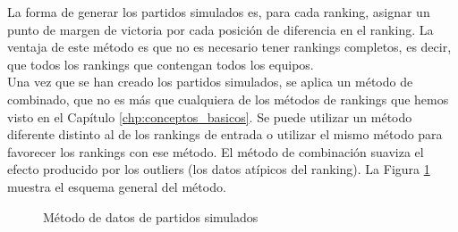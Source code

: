 La forma de generar los partidos simulados es, para cada ranking, asignar un punto de margen de victoria por cada posición de diferencia en el ranking. La ventaja de este método es que no es necesario tener rankings completos, es decir, que todos los rankings que contengan todos los equipos. \\

Una vez que se han creado los partidos simulados, se aplica un método de combinado, que no es más que cualquiera de los métodos de rankings que hemos visto en el Capítulo \ref{chp:conceptos_basicos}. Se puede utilizar un método diferente distinto al de los rankings de entrada o utilizar el mismo método para favorecer los rankings con ese método. El método de combinación suaviza el efecto producido por los outliers (los datos atípicos del ranking). La Figura \ref{fig:partidos_simulados} muestra el esquema general del método.

\begin{figure}[htb]
\centering
\partidossimulados
\caption{Método de datos de partidos simulados}
\label{fig:partidos_simulados}
\end{figure}

